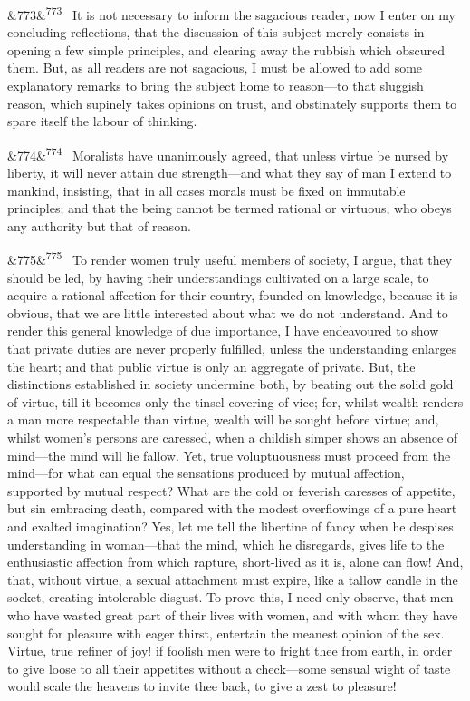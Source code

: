 \documentclass[12pt]{article}
\newcommand{\para}[1][]{\par\noindent\ifx&#1&\else\textsuperscript{\footnotesize #1}~\fi}
\begin{document}
\para[773] It is not necessary to inform the sagacious reader, now I enter on my concluding reflections, that the discussion of this subject merely consists in opening a few simple principles, and clearing away the rubbish which obscured them. But, as all readers are not sagacious, I must be allowed to add some explanatory remarks to bring the subject home to reason---to that sluggish reason, which supinely takes opinions on trust, and obstinately supports them to spare itself the labour of thinking.

\para[774] Moralists have unanimously agreed, that unless virtue be nursed by liberty, it will never attain due strength---and what they say of man I extend to mankind, insisting, that in all cases morals must be fixed on immutable principles; and that the being cannot be termed rational or virtuous, who obeys any authority but that of reason.

\para[775] To render women truly useful members of society, I argue, that they should be led, by having their understandings cultivated on a large scale, to acquire a rational affection for their country, founded on knowledge, because it is obvious, that we are little interested about what we do not understand. And to render this general knowledge of due importance, I have endeavoured to show that private duties are never properly fulfilled, unless the understanding enlarges the heart; and that public virtue is only an aggregate of private. But, the distinctions established in society undermine both, by beating out the solid gold of virtue, till it becomes only the tinsel-covering of vice; for, whilst wealth renders a man more respectable than virtue, wealth will be sought before virtue; and, whilst women's persons are caressed, when a childish simper shows an absence of mind---the mind will lie fallow. Yet, true voluptuousness must proceed from the mind---for what can equal the sensations produced by mutual affection, supported by mutual respect? What are the cold or feverish caresses of appetite, but sin embracing death, compared with the modest overflowings of a pure heart and exalted imagination? Yes, let me tell the libertine of fancy when he despises understanding in woman---that the mind, which he disregards, gives life to the enthusiastic affection from which rapture, short-lived as it is, alone can flow! And, that, without virtue, a sexual attachment must expire, like a tallow candle in the socket, creating intolerable disgust. To prove this, I need only observe, that men who have wasted great part of their lives with women, and with whom they have sought for pleasure with eager thirst, entertain the meanest opinion of the sex. Virtue, true refiner of joy! if foolish men were to fright thee from earth, in order to give loose to all their appetites without a check---some sensual wight of taste would scale the heavens to invite thee back, to give a zest to pleasure!
\end{document}
